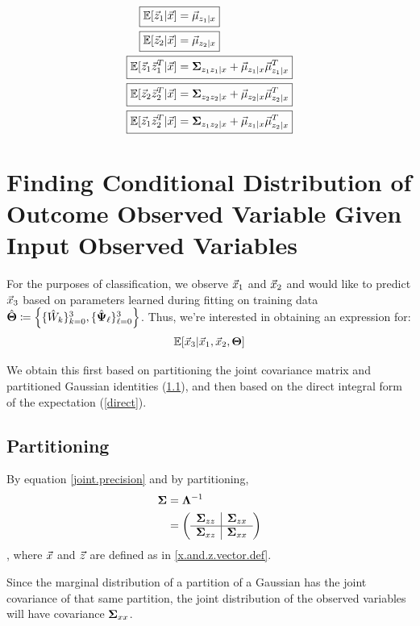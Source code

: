 \begin{align}
 \Aboxed{ \ev[\z_1| \x] &=  \vmu_{z_1 |x} } \label{postexp:1} \\
\Aboxed{  \ev[\z_2| \x] &=  \vmu_{z_2 |x} }\\
\Aboxed{  \ev[\z_1\z_1^T | \x] &= \bSigma_{z_1z_1|x} +
                         \vmu_{z_1|x}\vmu_{z_1|x}^T}\\
\Aboxed{    \ev[\z_2\z_2^T | \x] &= \bSigma_{z_2z_2|x} +
                           \vmu_{z_2|x}\vmu_{z_2|x}^T }\\
\Aboxed{      \ev[\z_1\z_2^T | \x] &= \bSigma_{z_1z_2|x} + \vmu_{z_1|x}\vmu_{z_2|x}^T                }\label{postexp:5}
\end{align}


\pagebreak %
\section{Finding Conditional Distribution of Outcome Observed Variable
  Given Input Observed Variables}
For the purposes of classification, we observe $\vec{x}_1$ and $\vec{x}_2$ and
would like to predict $\vec{x}_3$ based on parameters learned during
fitting on training data $\hat{\bold{\Theta}} \coloneqq \left\{ \{\hat{W}_k\}_{k=0}^3 ,
  \{\hat{\bold{\Psi}}_\ell\}_{\ell=0}^3  \right\}$. Thus, we're interested in
obtaining an expression for:
\begin{align}
\mathbb{E} [ \vec{x}_3 | \vec{x}_1, \vec{x}_2, \bold{\Theta}]
\end{align}

We obtain this first based on partitioning the joint covariance matrix and
partitioned Gaussian identities (\ref{partitioning}), and then based on the direct integral form of the expectation (\ref{direct}).
\subsection{Partitioning} \label{partitioning}
By equation \ref{joint.precision} and by partitioning, 
\begin{align}
  \bold{\Sigma} &=  \bold{\Lambda}^{-1} \\
&= \left(
  \begin{array}{c|c}
      \bold{\Sigma}_{zz} & \bold{\Sigma}_{zx} \\ \hline
      \bold{\Sigma}_{xz} & \bold{\Sigma}_{xx} \\
  \end{array}
  \right) 
\end{align}, where $\vec{x}$ and $\vec{z}$ are defined as in \ref{x.and.z.vector.def}.


Since the marginal distribution of a partition of a Gaussian has
the joint covariance of that same partition, the joint distribution
of the observed variables will have covariance $\bold{\Sigma}_{xx}$. 


